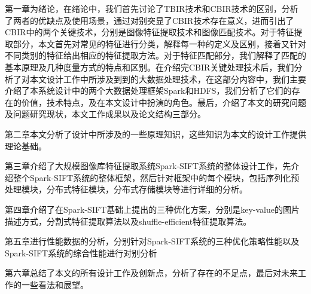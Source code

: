 第一章为绪论，在绪论中，我们首先讨论了TBIR技术和CBIR技术的区别，分析了两者的优缺点及使用场景，通过对别突显了CBIR技术存在意义，进而引出了CBIR中的两个关键技术，分别是图像特征提取技术和图像匹配技术。对于特征提取部分，本文首先对常见的特征进行分类，解释每一种的定义及区别，接着又针对不同类别的特征给出相应的特征提取方法。对于特征匹配部分，我们解释了匹配的基本原理及几种度量方式的特点和区别。在介绍完CBIR关键处理技术后，我们分析了对本文设计工作中所涉及到到的大数据处理技术，在这部分内容中，我们主要介绍了本系统设计中的两个大数据处理框架Spark和HDFS，我们分析了它们的存在的价值，技术特点，及在本文设计中扮演的角色。最后，介绍了本文的研究问题及问题研究现状，本文工作成果以及论文结构三部分。

第二章本文分析了设计中所涉及的一些原理知识，这些知识为本文的设计工作提供理论基础。

第三章介绍了大规模图像库特征提取系统Spark-SIFT系统的整体设计工作，先介绍整个Spark-SIFT系统的整体框架，然后针对框架中的每个模块，包括序列化预处理模块，分布式特征模块，分布式存储模块等进行详细的分析。

第四章介绍了在Spark-SIFT基础上提出的三种优化方案，分别是key-value的图片描述方式，分割式特征提取算法以及shuffle-efficient特征提取算法。

第五章进行性能数据的分析，分别针对Spark-SIFT系统的三种优化策略性能以及Spark-SIFT系统的综合性能进行对别分析

第六章总结了本文的所有设计工作及创新点，分析了存在的不足点，最后对未来工作的一些看法和展望。


